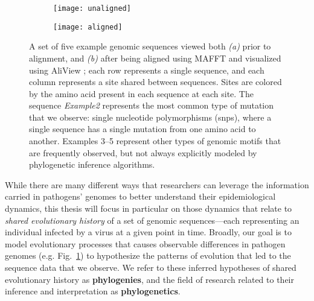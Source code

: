 \begin{figure}[ht]
  \centering
  \begin{subfigure}{0.95\textwidth}
    \texttt{[image: unaligned]}
    \caption{}
  \end{subfigure}
  \begin{subfigure}{0.95\textwidth}
    \texttt{[image: aligned]}
    \caption{}
  \end{subfigure}
  \caption[Multiple sequence alignment]{A set of five example genomic sequences viewed both \textit{(a)} prior to alignment, and \textit{(b)} after being aligned using MAFFT \citep{katoh2013mafft} and visualized using AliView \citep{larsson2014aliview}; each row represents a single sequence, and each column represents a site shared between sequences. Sites are colored by the amino acid present in each sequence at each site. The sequence \textit{Example2} represents the most common type of mutation that we observe: single nucleotide polymorphisms (\gls{snp}s), where a single sequence has a single mutation from one amino acid to another. Examples 3--5 represent other types of genomic motifs that are frequently observed, but not always explicitly modeled by phylogenetic inference algorithms.}
  \label{fig:alignment}
\end{figure}

While there are many different ways that researchers can leverage the information carried in pathogens' genomes to better understand their epidemiological dynamics, this thesis will focus in particular on those dynamics that relate to \textit{shared evolutionary history} of a set of genomic sequences---each representing an individual infected by a virus at a given point in time.
Broadly, our goal is to model evolutionary processes that causes observable differences in pathogen genomes (e.g. Fig.~\ref{fig:alignment}) to hypothesize the patterns of evolution that led to the sequence data that we observe.
We refer to these inferred hypotheses of shared evolutionary history as \textbf{phylogenies}, and the field of research related to their inference and interpretation as \textbf{phylogenetics}.


